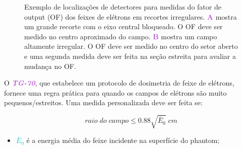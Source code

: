 \documentclass[11pt,a4paper]{article}
\newcounter{exemplo}
\begin{document}
	\begin{figure}[h]
		\centering
		\caption{Exemplo de localizações de detectores para medidas do fator de output (OF) dos feixes de elétrons em recortes irregulares. \textcolor{MediumOrchid}{\textbf{A}} mostra um grande recorte com o eixo central bloqueado. O OF deve ser medido no centro aproximado do campo. \textcolor{MediumOrchid}{\textbf{B}} mostra um campo altamente irregular. O OF deve ser medido no centro do setor aberto e uma segunda medida deve ser feita na seção estreita para avaliar a mudança no OF.}
		\label{fig:locaisDetectoresEletrons}
	\end{figure}


	O \textcolor{MediumOrchid}{\textbf{\textit{TG-70}}}, que estabelece um protocolo de dosimetria de feixe de elétrons, fornece uma regra prática para quando os campos de elétrons são muito pequenos/estreitos. Uma medida personalizada deve ser feita se:

		\begin{equation}
			raio \; do \; campo \leq 0.88 \sqrt{\bar{E}_0} \; cm
		\end{equation}

	\begin{exemplo}[onde:]
		\begin{itemize}[label=\textcolor{CarnationPink}{$\star$}]
			\item \textcolor{DarkTurquoise}{$\bar{E}_0$} é a energia média do feixe incidente na superfície do phantom;
		\end{itemize}
	\end{exemplo}

	\begin{figure}[h]
		\centering
	\end{figure}
\end{document}
